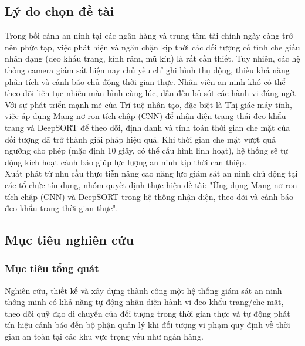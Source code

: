 \documentclass[a4paper,12pt]{article}
\begin{document}
\subsection{Lý do chọn đề tài}
Trong bối cảnh an ninh tại các ngân hàng và trung tâm tài chính ngày càng trở nên phức tạp, việc phát hiện và ngăn chặn kịp thời các đối tượng cố tình che giấu nhân dạng (đeo khẩu trang, kính râm, mũ kín) là rất cần thiết. Tuy nhiên, các hệ thống camera giám sát hiện nay chủ yếu chỉ ghi hình thụ động, thiếu khả năng phân tích và cảnh báo chủ động thời gian thực. Nhân viên an ninh khó có thể theo dõi liên tục nhiều màn hình cùng lúc, dẫn đến bỏ sót các hành vi đáng ngờ.\\
Với sự phát triển mạnh mẽ của Trí tuệ nhân tạo, đặc biệt là Thị giác máy tính, việc áp dụng Mạng nơ-ron tích chập (CNN) để nhận diện trạng thái đeo khẩu trang và DeepSORT để theo dõi, định danh và tính toán thời gian che mặt của đối tượng đã trở thành giải pháp hiệu quả. Khi thời gian che mặt vượt quá ngưỡng cho phép (mặc định 10 giây, có thể cấu hình linh hoạt), hệ thống sẽ tự động kích hoạt cảnh báo giúp lực lượng an ninh kịp thời can thiệp.\\
Xuất phát từ nhu cầu thực tiễn nâng cao năng lực giám sát an ninh chủ động tại các tổ chức tín dụng, nhóm quyết định thực hiện đề tài: "Ứng dụng Mạng nơ-ron tích chập (CNN) và DeepSORT trong hệ thống nhận diện, theo dõi và cảnh báo đeo khẩu trang thời gian thực".

\subsection{Mục tiêu nghiên cứu}
\subsubsection{Mục tiêu tổng quát}
Nghiên cứu, thiết kế và xây dựng thành công một hệ thống giám sát an ninh thông minh có khả năng tự động nhận diện hành vi đeo khẩu trang/che mặt, theo dõi quỹ đạo di chuyển của đối tượng trong thời gian thực và tự động phát tín hiệu cảnh báo đến bộ phận quản lý khi đối tượng vi phạm quy định về thời gian an toàn tại các khu vực trọng yếu như ngân hàng.
\end{document}
